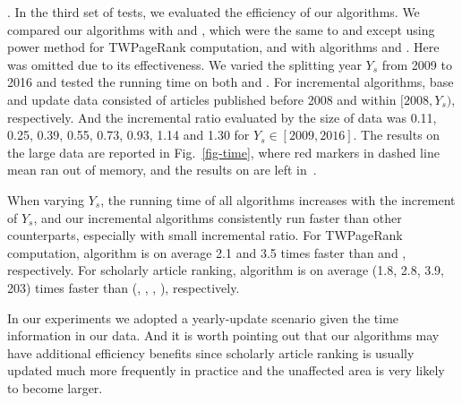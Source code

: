 .
In the third set of tests, we evaluated the efficiency of our algorithms.
%
We compared our algorithms with \powtwprscc and \powensemble, which were the same to \twprscc and \batensemble except using power method for TWPageRank computation, and with algorithms \futurerank and \hhgrank.
Here \pagerank was omitted due to its effectiveness.
%
We varied the splitting year $Y_s$ from 2009 to 2016 and tested the running time on both \aminer and \magdata.
%
For incremental algorithms, base and update data consisted of articles published before 2008 and within $[2008, Y_s)$, respectively. And the incremental ratio evaluated by the size of data was 0.11, 0.25, 0.39, 0.55, 0.73, 0.93, 1.14 and 1.30 for $Y_s\in[2009,2016]$.
%
The results on the large data \magdata are reported in Fig.~\ref{fig-time}, where red markers \marked{$\Box$} in dashed line mean \hhgrank ran out of memory, and the results on \aminer are left in~\cite{ERank-full}.

When varying $Y_s$, the running time of all algorithms increases with the increment of $Y_s$, and our incremental algorithms
consistently run faster than other counterparts, especially with small incremental ratio.
%
For TWPageRank computation, algorithm \inctwprscc is on average 2.1 and 3.5 times faster than \twprscc and \powtwprscc, respectively.
%
For scholarly article ranking, algorithm \incensemble is on average (1.8, 2.8, 3.9, 203) times faster than (\batensemble, \powensemble, \futurerank, \hhgrank), respectively.

In our experiments we adopted a yearly-update scenario given the time information in our data. And it is worth pointing out that our algorithms may have additional efficiency benefits since scholarly article ranking is usually updated much more frequently in practice and the unaffected area is very likely to become larger.




